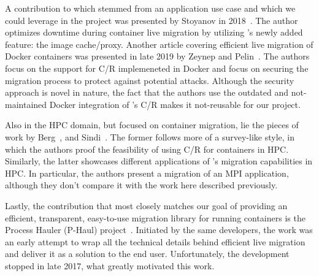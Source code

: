 A contribution to \criu which stemmed from an application use case and which we could leverage in the project was presented by Stoyanov in 2018~\cite{Stoyanov2018}.
The author optimizes downtime during container live migration by utilizing \criu's newly added feature: the image cache/proxy.
Another article covering efficient live migration of Docker containers was presented in late 2019 by Zeynep and Pelin~\cite{Zeynep2019}.
The authors focus on the support for C/R implemeneted in Docker and focus on securing the migration process to protect against potential attacks.
Although the security approach is novel in nature, the fact that the authors use the outdated and not-maintained Docker integration of \criu's C/R makes it not-reusable for our project.

Also in the HPC domain, but focused on container migration, lie the pieces of work by Berg~\cite{Berg2017}, and Sindi~\cite{Sindi2019}.
The former follows more of a survey-like style, in which the authors proof the feasibility of using C/R for containers in HPC.
Similarly, the latter showcases different applications of \criu's migration capabilities in HPC.
In particular, the authors present a migration of an MPI application, although they don't compare it with the work here described previously.

Lastly, the contribution that most closely matches our goal of providing an efficient, transparent, easy-to-use migration library for running containers is the Process Hauler (P-Haul) project~\cite{phaul-criu,phaul-github}.
Initiated by the same \criu developers, the work was an early attempt to wrap all the technical details behind efficient live migration and deliver it as a solution to the end user.
Unfortunately, the development stopped in late 2017, what greatly motivated this work.
